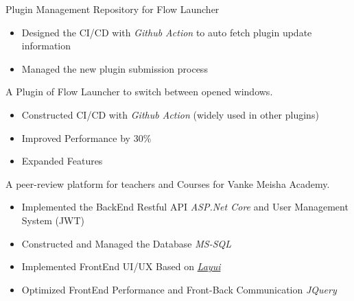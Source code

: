 \documentclass{resume}
\begin{document}
Plugin Management Repository for Flow Launcher
\begin{itemize}
  \item Designed the CI/CD with \textit{Github Action} to auto fetch plugin update information
  \item Managed the new plugin submission process
\end{itemize}

A Plugin of Flow Launcher to switch between opened windows.
\begin{itemize}
  \item Constructed CI/CD with \textit{Github Action} (widely used in other plugins)
  \item Improved Performance by 30\%
  \item Expanded Features
\end{itemize}

A peer-review platform for teachers and Courses for Vanke Meisha Academy.
\begin{itemize}
  \item Implemented the BackEnd Restful API \textit{ASP.Net Core} and User Management System (JWT)
  \item Constructed and Managed the Database \textit{MS-SQL}
  \item Implemented FrontEnd UI/UX Based on \textit{\href{https://layui.github.io/}{Layui}}
  \item Optimized FrontEnd Performance and Front-Back Communication \textit{JQuery}
\end{itemize}


\end{document}
